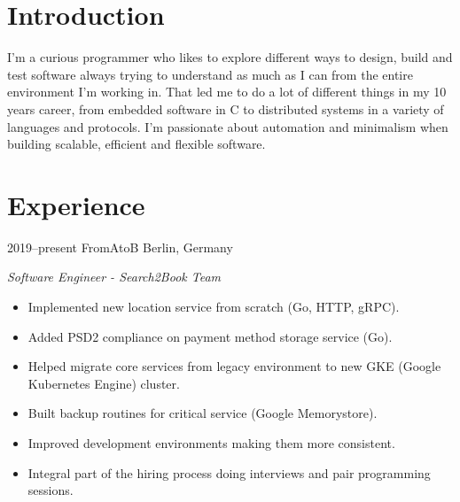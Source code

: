 \documentclass[]{friggeri-cv} %
\begin{document}

\section{Introduction}

\begin{entrylist}
\entry
{}
{}
{}
{
I'm a curious programmer who likes to explore different ways to design, build and test software
always trying to understand as much as I can from the entire environment I'm working in.
That led me to do a lot of different things in my 10 years career, from embedded
software in C to distributed systems in a variety of languages and protocols.
I'm passionate about automation and minimalism when building scalable, efficient and flexible software.
}
\end{entrylist}


\section{Experience}

\begin{entrylist}
\entry
{2019--present}
{FromAtoB}
{Berlin, Germany}
{\emph{Software Engineer - Search2Book Team} \\

\begin{itemize}
  \item Implemented new location service from scratch (Go, HTTP, gRPC).
  \item Added PSD2 compliance on payment method storage service (Go).
  \item Helped migrate core services from legacy environment to new GKE (Google Kubernetes Engine) cluster.
  \item Built backup routines for critical service (Google Memorystore).
  \item Improved development environments making them more consistent.
  \item Integral part of the hiring process doing interviews and pair programming sessions.
\end{itemize}

}
\end{entrylist}
\end{document}
